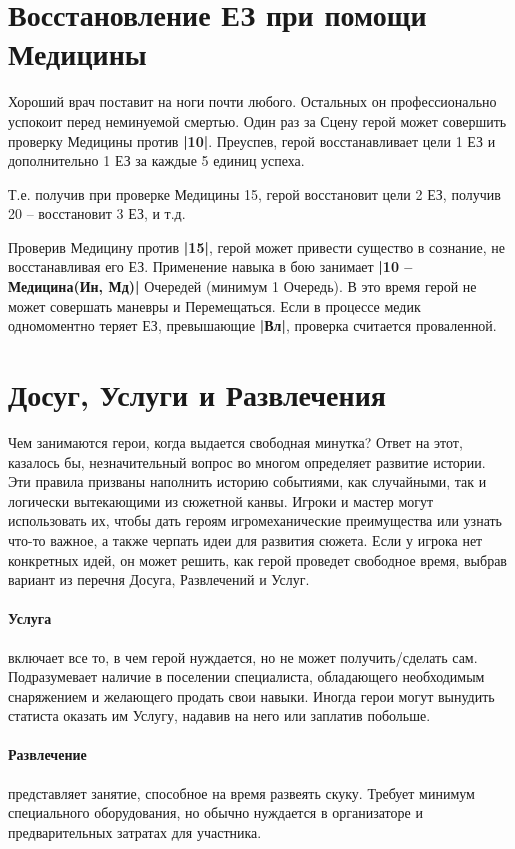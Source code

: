 \section{Восстановление ЕЗ при помощи Медицины}
Хороший врач поставит на ноги почти любого. Остальных он профессионально успокоит перед неминуемой смертью.
\newline Один раз за Сцену герой может совершить проверку Медицины против \textbf{|10|}. Преуспев, герой восстанавливает цели 1 ЕЗ и дополнительно 1 ЕЗ за каждые 5 единиц успеха.
\begin{tcolorbox}
  Т.е. получив при проверке Медицины 15, герой восстановит цели 2 ЕЗ, получив 20 – восстановит 3 ЕЗ, и т.д.
\end{tcolorbox}
Проверив Медицину против \textbf{|15|}, герой может привести существо в сознание, не восстанавливая его ЕЗ. 
\newline Применение навыка в бою занимает \textbf{|10 – Медицина(Ин, Мд)|} Очередей (минимум 1 Очередь). В это время герой не может совершать маневры и Перемещаться. Если в процессе медик одномоментно теряет ЕЗ, превышающие \textbf{|Вл|}, проверка считается проваленной. 

\section{Досуг, Услуги и Развлечения}
Чем занимаются герои, когда выдается свободная минутка? Ответ на этот, казалось бы, незначительный вопрос во многом определяет развитие истории. 
\newline Эти правила призваны наполнить историю событиями, как случайными, так и логически вытекающими из сюжетной канвы. Игроки и мастер могут использовать их, чтобы дать героям игромеханические преимущества или узнать что-то важное, а также черпать идеи для развития сюжета. 
\newline Если у игрока нет конкретных идей, он может решить, как герой проведет свободное время, выбрав вариант из перечня Досуга, Развлечений и Услуг.

\paragraph{Услуга} включает все то, в чем герой нуждается, но не может получить/сделать сам. Подразумевает наличие в поселении специалиста, обладающего необходимым снаряжением и желающего продать свои навыки. Иногда герои могут вынудить статиста оказать им Услугу, надавив на него или заплатив побольше.
\paragraph{Развлечение} представляет занятие, способное на время развеять скуку. Требует минимум специального оборудования, но обычно нуждается в организаторе и предварительных затратах для участника. 
